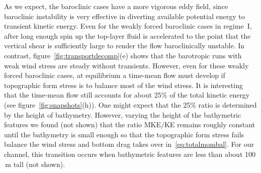 \documentclass{agujournal2019}
\newcommand{\navidcomment}[1]{{\color{red} [#1]}}
\newcommand{\av}[1]	    {\left \langle {#1} \right \rangle}
\newcommand{\ws} {\mathrm{WS}}
\newcommand{\tfs} {\mathrm{TFS}}
\newcommand{\ifs} {\mathrm{IFS}}
\newcommand{\bd} {\mathrm{BD}}
\begin{document}
As we expect, the baroclinic cases have a  more vigorous eddy field, since baroclinic instability is very effective in diverting available potential energy to transient kinetic energy. Even for the weakly forced baroclinic cases in regime~I, after long enough spin up the top-layer fluid is accelerated to the point that the vertical shear is sufficiently large to render the flow baroclinically unstable. In contrast, figure~\ref{fig:transportdecomp}(e) shows that the barotropic runs with weak wind stress are steady without transients.  However, even for these weakly forced baroclinic cases, at equilibrium a time-mean flow must develop if topographic form stress is to balance most of the wind stress. It is interesting that the time-mean flow still accounts for about 25\% of the total kinetic energy (see figure~\ref{fig:snapshots}(h)). One might expect that the 25\% ratio is determined by the height of bathymetry. However, varying the height of the bathymetric features we found (not shown) that the ratio MKE$/$KE remains roughly constant until the bathymetry is small enough so that the topographic form stress fails balance the wind stress and bottom drag takes over in~\eqref{eq:totalmombal}. For our channel, this transition occurs when bathymetric features are less than about 100$\,\text{m}$ tall (not shown).

\end{document}
